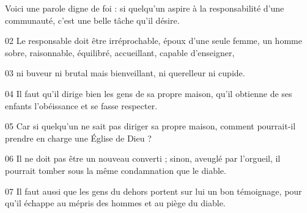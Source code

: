 Voici une parole digne de foi : si quelqu’un aspire à la responsabilité d’une communauté, c’est une belle tâche qu’il désire.

02 Le responsable doit être irréprochable, époux d’une seule femme, un homme sobre, raisonnable, équilibré, accueillant, capable d’enseigner,

03 ni buveur ni brutal mais bienveillant, ni querelleur ni cupide.

04 Il faut qu’il dirige bien les gens de sa propre maison, qu’il obtienne de ses enfants l’obéissance et se fasse respecter.

05 Car si quelqu’un ne sait pas diriger sa propre maison, comment pourrait-il prendre en charge une Église de Dieu ?

06 Il ne doit pas être un nouveau converti ; sinon, aveuglé par l’orgueil, il pourrait tomber sous la même condamnation que le diable.

07 Il faut aussi que les gens du dehors portent sur lui un bon témoignage, pour qu’il échappe au mépris des hommes et au piège du diable.
